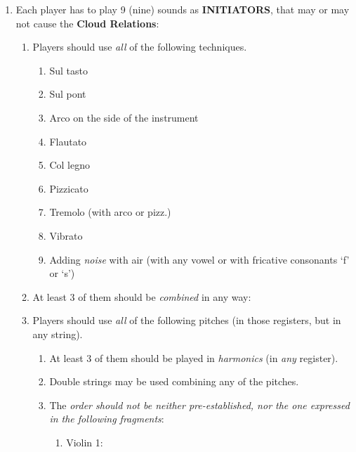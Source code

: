 \begin{enumerate}
\def\labelenumi{\arabic{enumi}.}
\item
  Each player has to play 9 (nine) sounds as \textbf{INITIATORS}, that
  may or may not cause the \textbf{Cloud Relations}:

  \begin{enumerate}
  \def\labelenumii{\arabic{enumii}.}
  \item
    Players should use \emph{all} of the following techniques.

    \begin{enumerate}
    \def\labelenumiii{\arabic{enumiii}.}
    \item
      Sul tasto
    \item
      Sul pont
    \item
      Arco on the side of the instrument
    \item
      Flautato
    \item
      Col legno
    \item
      Pizzicato
    \item
      Tremolo (with arco or pizz.)
    \item
      Vibrato
    \item
      Adding \emph{noise} with air (with any vowel or with fricative
      consonants `f' or `s')
    \end{enumerate}
  \item
    At least 3 of them should be \emph{combined} in any way:
  \item
    Players should use \emph{all} of the following pitches (in those
    registers, but in any string).

    \begin{enumerate}
    \def\labelenumiii{\arabic{enumiii}.}
    \item
      At least 3 of them should be played in \emph{harmonics} (in
      \emph{any} register).
    \item
      Double strings may be used combining any of the pitches.
    \item
      The \emph{order should not be neither pre-established, nor the one
      expressed in the following fragments}:

      \begin{enumerate}
      \def\labelenumiv{\arabic{enumiv}.}
      \item
        Violin 1:
      \end{enumerate}
    \end{enumerate}
  \end{enumerate}
\end{enumerate}

